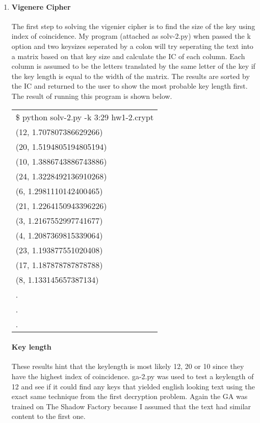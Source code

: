 \documentclass{article}
\begin{document}
\begin{enumerate}
\item \hfill 
  \paragraph{Vigenere Cipher}{The first step to solving the vigenier cipher is to find the size of the key using index of coincidence. My program (attached as solv-2.py) when passed the k option and two keysizes seperated by a colon will try seperating the text into a matrix based on that key size and calculate the IC of each column. Each column is assumed to be the letters translated by the same letter of the key if the key length is equal to the width of the matrix. The results are sorted by the IC and returned to the user to show the most probable key length first. The result of running this program is shown below.}

  \begin{center}
    \begin{tabular}{l}
      \$ python solv-2.py -k 3:29 hw1-2.crypt\\
      (12, 1.707807386629266)\\
      (20, 1.5194805194805194)\\
      (10, 1.3886743886743886)\\
      (24, 1.3228492136910268)\\
      (6, 1.2981110142400465)\\
      (21, 1.2264150943396226)\\
      (3, 1.2167552997741677)\\
      (4, 1.2087369815339064)\\
      (23, 1.193877551020408)\\
      (17, 1.187878787878788)\\
      (8, 1.133145657387134)\\
      .\\
      .\\
      .\\
    \end{tabular}
  \end{center}

  \paragraph{Key length}{These results hint that the keylength is most likely 12, 20 or 10 since they have the highest index of coincidence. ga-2.py was used to test a keylength of 12 and see if it could find any keys that yielded english looking text using the exact same technique from the first decryption problem. Again the GA was trained on The Shadow Factory because I assumed that the text had similar content to the first one.}


\end{enumerate}
\end{document}
